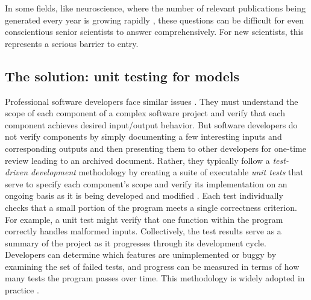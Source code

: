 \documentclass{frontiersSCNS}
\begin{document}
In some fields, like neuroscience, where the number of relevant publications being generated every year is growing rapidly \citep{jinha_article_2010}, these questions can be difficult for even conscientious senior scientists to answer comprehensively. 
For new scientists, this represents a serious barrier to entry. 






\subsection{The solution: unit testing for models}
Professional software developers face similar issues \citep{omar_sciunit_2013}. 
They must understand the scope of each component of a complex software project and verify that each component achieves desired input/output behavior. 
But software developers do not verify components by simply documenting a few interesting inputs and corresponding outputs and then presenting them to other developers for one-time review leading to an archived document. 
Rather, they typically follow a \emph{test-driven development} methodology by creating a suite of executable \emph{unit tests} that serve to specify each component's scope and verify its implementation on an ongoing basis as it is being developed and modified \citep{beck2003}. 
Each test individually checks that a small portion of the program meets a single correctness criterion. 
For example, a unit test might verify that one function within the program correctly handles malformed inputs. 
Collectively, the test results serve as a summary of the project as it progresses through its development cycle. 
Developers can determine which features are unimplemented or buggy by examining the set of failed tests, and progress can be measured in terms of how many tests the program passes over time. 
This methodology is widely adopted in practice \citep{beck2003}.
\end{document}
